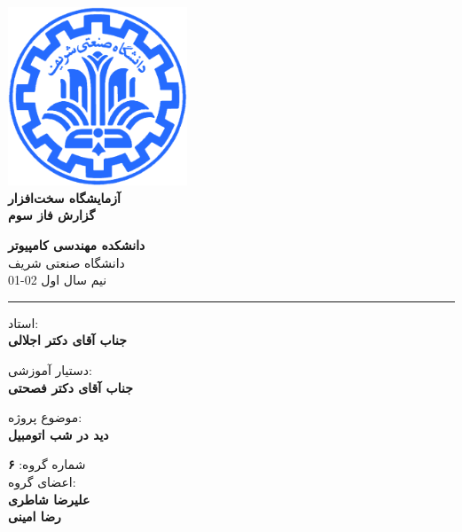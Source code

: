 \documentclass[12pt]{article}
\begin{document}
\begin{titlepage}
\begin{center}
        
\vspace*{0.7cm}

\includegraphics[width=0.4\textwidth]{sharif1.png}\\
\vspace{0.5cm}
\textbf{ \Huge{\emph ‌آزمایشگاه سخت‌افزار} }\\
\vspace{0.5cm}
\textbf{ \Large{گزارش فاز سوم} }
\vspace{0.2cm}
       
 
      \large \textbf{دانشکده مهندسی کامپیوتر}\\\vspace{0.2cm}
    \large   دانشگاه صنعتی شریف\\\vspace{0.2cm}
       \large   ﻧﯿﻢ سال اول 02-01 \\\vspace{0.2cm}
      \noindent\rule[1ex]{\linewidth}{1pt}
استاد:\\
    \textbf{{جناب آقای دکتر اجلالی}}


دستیار آموزشی:\\
\textbf{{جناب آقای دکتر فصحتی}}

    \vspace{0.25cm}
    
    موضوع پروژه:\\
    
    \textbf{دید در شب اتومبیل}
    
    \vspace{0.35cm}
    
    
        شماره گروه:
    \textbf{{۶}}\\
    
اعضای گروه:\\

    \textbf{{علیرضا شاطری}}
    \\
   
     \textbf{{رضا امینی}}   
\end{center}
\end{titlepage}
\end{document}
